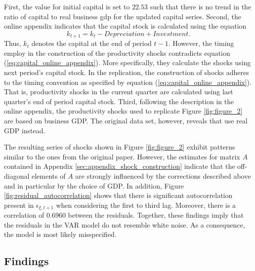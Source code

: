 First, the value for initial capital is set to $22.53$ such that there is no trend in the ratio of capital to real business gdp for the updated capital series. Second, the online appendix indicates that the capital stock is calculated using the equation
\begin{equation} 
	\label{eq:capital_online_appendix}
	k_{t+1} = k_{t} - Depreciation + Investment.
\end{equation} 
Thus, ${k}_t$ denotes the capital at the end of period $t-1$. However, the timing \citeauthor{JERMANNfinancial} employ in the construction of the productivity shocks contradicts equation (\ref{eq:capital_online_appendix}). More specifically, they calculate the shocks using next period's capital stock. In the replication, the construction of shocks adheres to the timing convention as specified by equation (\ref{eq:capital_online_appendix}). That is, productivity shocks in the current quarter are calculated using last quarter's end of period capital stock. Third, following the description in the online appendix, the productivity shocks used to replicate Figure \ref{fig:figure_2} are based on business GDP. The original data set, however, reveals that \citeauthor{JERMANNfinancial} use real GDP instead. 

The resulting series of shocks shown in Figure \ref{fig:figure_2} exhibit patterns similar to the ones from the original paper. However, the estimates for matrix $A$ contained in Appendix \ref{sec:appendix_shock_construction} indicate that the off-diagonal elements of $A$ are strongly influenced by the corrections described above and in particular by the choice of GDP. In addition, Figure \ref{fig:residual_autocorrelation} shows that there is significant autocorrelation present in ${\epsilon}_{\xi,t+1}$ when considering the first to third lag. Moreover, there is a correlation of $0.6960$ between the residuals. Together, these findings imply that the residuals in the VAR model do not resemble white noise. As a consequence, the model is most likely misspecified.


\subsection{Findings}
\label{sec:findings}



